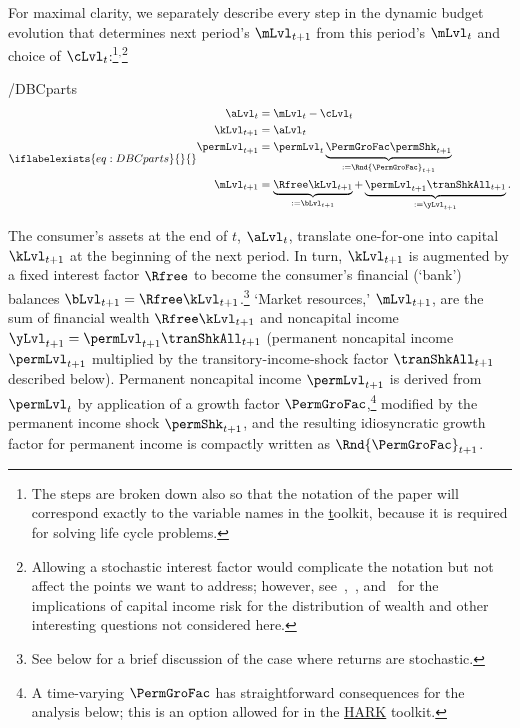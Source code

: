 \documentclass[BufferStockTheory]{subfiles}
\begin{document}
\hypertarget{checkRestrictions}{}
\hypertarget{DBCparts}{}
For maximal clarity, we separately describe every step in the dynamic budget evolution that determines next period's $\mLvl_{t+1}$ from this period's $\mLvl_{t}$ and choice of $\cLvl_{t}$:\footnote{The steps are broken down also so that the notation of the paper will correspond exactly to the variable names in the \href{https://github.com/econ-ark/HARK} toolkit, because it is required for solving life cycle problems.}$^{,}$\footnote{Allowing a stochastic interest factor would complicate the notation but not affect the points we want to address; however, see~\cite{benhabibWealth},~\cite{maTodaRich}, and~\cite{mstIncFluct} for the implications of capital income risk for the distribution of wealth and other interesting questions not considered here.}

\begin{verbatimwrite}{\EqDir/DBCparts}
  \begin{equation}\iflabelexists{eq:DBCparts}{}{\label{eq:DBCparts}} %
    \begin{split}
      \aLvl_{t}     & = \mLvl_{t}-\cLvl_{t}  \\
      \kLvl_{t+1}   & = \aLvl_{t} \notag \\
      \permLvl_{t+1}  & = \permLvl_{t} \underbrace{\PermGroFac\permShk_{t+1}}_{:= \Rnd{\PermGroFac}_{t+1}} \notag \\
      \mLvl_{t+1}  & =   \underbrace{\Rfree \kLvl_{t+1}}_{:= \bLvl_{t+1}}  +\underbrace{\permLvl_{t+1}\tranShkAll_{t+1}}_{:= \yLvl_{t+1}}. \notag
    \end{split}
  \end{equation}
\end{verbatimwrite}


The consumer's assets at the end of $t$, $\aLvl_{t}$, translate one-for-one into capital $\kLvl_{t+1}$ at the beginning of the next period. In turn, $\kLvl_{t+1}$ is augmented by a fixed interest factor $\Rfree$ to become the consumer's financial (`bank') balances $\bLvl_{t+1} = \Rfree \kLvl_{t+1}$.\footnote{See below for a brief discussion of the case where returns are stochastic.} `Market resources,' $\mLvl_{t+1}$,  are the sum of financial wealth $\Rfree \kLvl_{t+1}$ and noncapital income $\yLvl_{t+1}=\permLvl_{t+1}\tranShkAll_{t+1}$ (permanent noncapital income $\permLvl_{t+1}$ multiplied by the transitory-income-shock factor $\tranShkAll_{t+1}$ described below). Permanent noncapital income $\permLvl_{t+1}$ is derived from $\permLvl_{t}$ by application of a growth factor $\PermGroFac$,\footnote{A time-varying $\PermGroFac$ has straightforward consequences for the analysis below; this is an option allowed for in the \href{https://econ-ark.org}{HARK} toolkit.} modified by the permanent income shock $\permShk_{t+1}$, and the resulting idiosyncratic growth factor for permanent income is compactly written as $\Rnd{\PermGroFac}_{t+1}$. 
\end{document}

